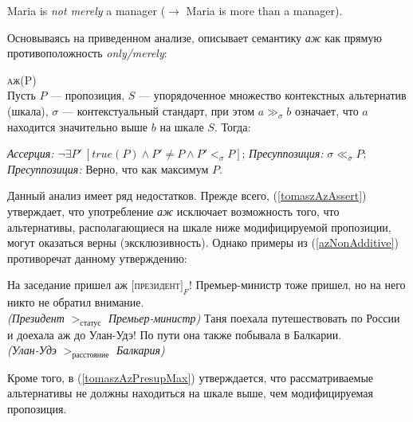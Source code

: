 \documentclass[a4paper, titlepage]{article}
\begin{document}
\begin{exe}
    \ex Maria is \textit{not merely} a manager ($ \rightarrow $ Maria is more than a manager).
\end{exe}

Основываясь на приведенном анализе, \citep{tomaszevicz2011az} описывает семантику \textit{аж} как прямую противоположность \textit{only/merely}:

\begin{exe}
    \ex \textsc{аж(P)} \\ {\footnotesize Пусть $ P $ --- пропозиция, $ S $ --- упорядоченное множество контекстных альтернатив (шкала), $ \sigma $ --- контекстуальный стандарт, при  этом $ a \gg_{\sigma} b $ означает, что $ a $ находится значительно выше $ b $ на шкале $ S $. Тогда:} \begin{xlist}
        \ex \label{tomaszAzAssert} \textit{Ассерция:} $ \lnot \exists P'\ [ true(P) \land P' \neq P \land P' <_{\sigma} P] $;
        \ex \textit{Пресуппозиция:} $ \sigma \ll_{\sigma} P $;
        \ex \label{tomaszAzPresupMax} \textit{Пресуппозиция:} Верно, что как максимум $ P $.
    \end{xlist}
\end{exe}

Данный анализ имеет ряд недостатков. Прежде всего, (\ref{tomaszAzAssert}) утверждает, что употребление \textit{аж} исключает возможность того, что альтернативы, располагающиеся на шкале ниже модифицируемой пропозиции, могут оказаться верны (эксклюзивность). Однако примеры из (\ref{azNonAdditive}) противоречат данному утверждению:

 \begin{exe}
    \ex \label{azNonAdditive} \begin{xlist}
        \ex На заседание пришел аж $ [ $\textsc{президент}$ ]_F $! Премьер-министр тоже пришел, но на него никто не обратил внимание. \\
            \textit{(Президент} $ >_{\text{статус}} $ \textit{Премьер-министр)}
        \ex Таня поехала путешествовать по России и доехала аж до Улан-Удэ! По пути она также побывала в Балкарии. \\
        \textit{(Улан-Удэ} $ >_{\text{расстояние}} $ \textit{Балкария)}
    \end{xlist}
\end{exe}

Кроме того, в (\ref{tomaszAzPresupMax}) утверждается, что рассматриваемые альтернативы не должны находиться на шкале выше, чем модифицируемая пропозиция.
\end{document}
